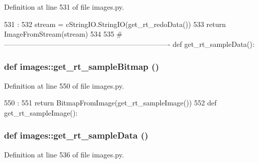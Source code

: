 Definition at line 531 of file images.py.


\begin{DoxyCode}
531                       :
532     stream = cStringIO.StringIO(get_rt_redoData())
533     return ImageFromStream(stream)
534 
535 #----------------------------------------------------------------------
def get_rt_sampleData():
\end{DoxyCode}
\hypertarget{namespaceimages_a2a484f98d9221ac1c151578c36a619ef}{
\subsubsection[{get\_\-rt\_\-sampleBitmap}]{\setlength{\rightskip}{0pt plus 5cm}def images::get\_\-rt\_\-sampleBitmap ()}}
\label{namespaceimages_a2a484f98d9221ac1c151578c36a619ef}


Definition at line 550 of file images.py.


\begin{DoxyCode}
550                          :
551     return BitmapFromImage(get_rt_sampleImage())
552 
def get_rt_sampleImage():
\end{DoxyCode}
\hypertarget{namespaceimages_a4548d73b14caad9e7d3b12445b317472}{
\subsubsection[{get\_\-rt\_\-sampleData}]{\setlength{\rightskip}{0pt plus 5cm}def images::get\_\-rt\_\-sampleData ()}}
\label{namespaceimages_a4548d73b14caad9e7d3b12445b317472}


Definition at line 536 of file images.py.


